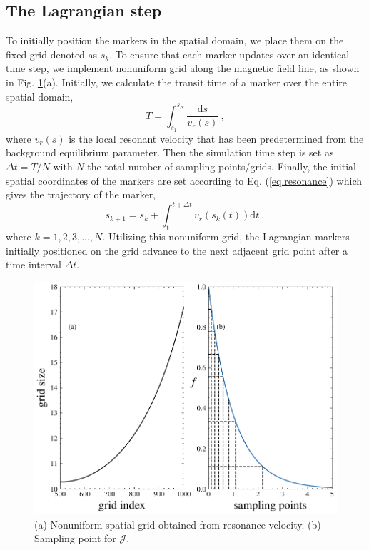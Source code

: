 
\subsection{The Lagrangian step}

To initially position the markers in the spatial domain, we place them on the fixed grid denoted as $s_k$.
To ensure that each marker updates over an identical time step, we implement nonuniform grid along the magnetic field line, as shown in Fig. \ref{fig.uni_grid}(a).
Initially, we calculate the transit time of a marker over the entire spatial domain,
\begin{equation}
    T = \int_{s_1}^{s_N} \frac{\mathrm{d}s}{v_r(s)}~,
\end{equation}
where $v_r(s)$ is the local resonant velocity that has been predetermined from the background equilibrium parameter.
Then the simulation time step is set as $\Delta t = T/N$ with $N$ the total number of sampling points/grids.
Finally, the initial spatial coordinates of the markers are set according to Eq. (\ref{eq.resonance}) which gives the trajectory of the marker,
\begin{equation}
    s_{k+1} = s_k +  \int_{t}^{t+\Delta t} v_r(s_k(t)) \mathrm{d}t~,
\end{equation}
where $k=1,2,3,...,N$.
Utilizing this nonuniform grid, the Lagrangian markers initially positioned on the grid advance to the next adjacent grid point after a time interval $\Delta t$.
\begin{figure}[htbp]
    \centering
    \includegraphics[scale=0.5]{cpc_img/fig_nu_grid.pdf}
    \caption{(a) Nonuniform spatial grid obtained from resonance velocity.
    (b) Sampling point for $\mathcal{J}$.
    }
    \label{fig.uni_grid}
\end{figure}
